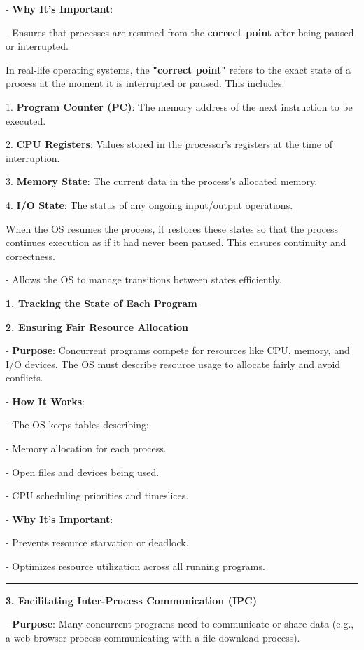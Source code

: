 \documentclass[a4paper]{book}
\begin{document}
   - \textbf{Why It's Important}:
     
     - Ensures that processes are resumed from the \textbf{correct point} after being paused or interrupted.
     
     In real-life operating systems, the \textbf{"correct point"} refers to the exact state of a process at the moment it is interrupted or paused. This includes:

1. \textbf{Program Counter (PC)}: The memory address of the next instruction to be executed.

2. \textbf{CPU Registers}: Values stored in the processor's registers at the time of interruption.

3. \textbf{Memory State}: The current data in the process's allocated memory.

4. \textbf{I/O State}: The status of any ongoing input/output operations.

When the OS resumes the process, it restores these states so that the process continues execution as if it had never been paused. This ensures continuity and correctness.

     - Allows the OS to manage transitions between states efficiently.

\textbf{1. Tracking the State of Each Program}

\textbf{2. Ensuring Fair Resource Allocation}

   - \textbf{Purpose}: Concurrent programs compete for resources like CPU, memory, and I/O devices. The OS must describe resource usage to allocate fairly and avoid conflicts.
   
   - \textbf{How It Works}:
     
     - The OS keeps tables describing:
       
       - Memory allocation for each process.
       
       - Open files and devices being used.
       
       - CPU scheduling priorities and timeslices.
   
   - \textbf{Why It's Important}:
     
     - Prevents resource starvation or deadlock.
     
     - Optimizes resource utilization across all running programs.

\rule{0.75\textwidth}{0.5pt}

\textbf{3. Facilitating Inter-Process Communication (IPC)}

   - \textbf{Purpose}: Many concurrent programs need to communicate or share data (e.g., a web browser process communicating with a file download process).
   
\end{document}
